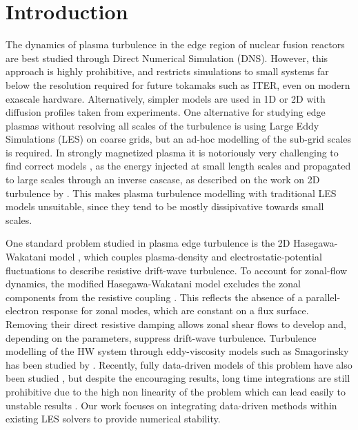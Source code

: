 \documentclass[authoryear,preprint,review,12pt]{elsarticle}
\begin{document}
\section{Introduction}\label{sec:Introduction}
The dynamics of plasma turbulence in the edge region of nuclear fusion reactors are best studied through Direct Numerical Simulation (DNS). However, this approach is highly prohibitive, and restricts simulations to small systems far below the resolution required for future tokamaks such as ITER, even on modern exascale hardware. Alternatively, simpler models are used in 1D or 2D with diffusion profiles taken from experiments.
One alternative for studying edge plasmas without resolving all scales of the turbulence is using Large Eddy Simulations (LES) on coarse grids, but an ad-hoc modelling of the sub-grid scales is required. In strongly magnetized plasma it is notoriously very challenging to find correct models \citep{leddy2016thesis}, as the energy injected at small length scales and propagated to large scales through an inverse cascase, as described on the work on 2D turbulence by \citet{kraichnan_inertial_1967}. This makes plasma turbulence modelling with traditional LES models unsuitable, since they tend to be mostly dissipivative towards small scales. 

One standard problem studied in plasma edge turbulence is the 2D Hasegawa-Wakatani model \citep{hasegawa_self-organization_1987}, which couples plasma-density and electrostatic-potential fluctuations to describe resistive drift-wave turbulence. To account for zonal-flow dynamics,
the modified Hasegawa-Wakatani model excludes the zonal components from the resistive coupling \citep{numata_bifurcation_2007}. This reflects the absence of a parallel-electron response for zonal modes, which are constant on a flux surface. Removing their direct resistive damping allows zonal shear flows to develop and, depending on the parameters, suppress drift-wave turbulence. 
Turbulence modelling of the HW system through eddy-viscosity models such as Smagorinsky has been studied by \citet{leddy2016thesis}. Recently, fully data-driven models of this problem have also been studied \citep{gahr2024scientific, artigues2025accelerating, greif2023physics}, but despite the encouraging results, long time integrations are still prohibitive due to the high non linearity of the problem which can lead easily to unstable results \citep{van_de_wetering_neural_2026}. Our work focuses on integrating data-driven methods within existing LES solvers to provide numerical stability.
\end{document}

